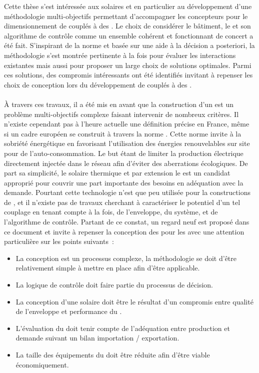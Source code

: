 

Cette thèse s’est intéressée aux  solaires et en particulier au développement
d’une méthodologie  multi-objectifs permettant d’accompagner les concepteurs pour le
dimensionnement de  couplés à des . Le choix de
considérer le bâtiment, le  et son algorithme de contrôle comme un ensemble
cohérent et fonctionnant de concert a été fait. S’inspirant de la norme  et
basée sur une aide à la décision a posteriori, la méthodologie s’est montrée pertinente
à la fois pour évaluer les interactions existantes mais aussi pour proposer un large choix
de solutions optimales. Parmi ces solutions, des compromis intéressants ont été
identifiés invitant à repenser les choix de conception lors du développement de 
couplés à des .


\paragraph{} %
À travers ces travaux, il a été mis en avant que la construction d’un  est un
problème multi-objectifs complexe faisant intervenir de nombreux critères. Il n’existe
cependant pas à l’heure actuelle une définition précise en France, même si un cadre
européen se construit à travers la norme . Cette norme invite à
la sobriété énergétique en favorisant l’utilisation des énergies renouvelables sur site
pour de l’auto-consommation. Le but étant de limiter la production électrique directement
injectée dans le réseau afin d’éviter des aberrations écologiques.
De part sa simplicité, le solaire thermique et par extension le  est un
candidat approprié pour couvrir une part importante des besoins en adéquation avec la
demande. Pourtant cette technologie n’est que peu utilisée pour la constructions de
, et il n’existe pas de travaux cherchant à caractériser le potentiel d’un tel
couplage en tenant compte à la fois, de l’enveloppe, du système, et de l’algorithme de
contrôle. Partant de ce constat, un regard neuf est proposé dans ce document et invite à
repenser la conception des  pour les  avec une attention
particulière sur les points suivants~:
\begin{itemize}
    \item La conception est un processus complexe, la méthodologie se doit d’être
          relativement simple à mettre en place afin d’être applicable.
    \item La logique de contrôle doit faire partie du processus de décision.
    \item La conception d’une  solaire doit être le résultat d’un compromis
          entre qualité de l’enveloppe et performance du .
    \item L’évaluation du  doit tenir compte de l’adéquation entre production
          et demande suivant un bilan importation / exportation.
    \item La taille des équipements du  doit être réduite afin d’être viable
          économiquement.
\end{itemize}

